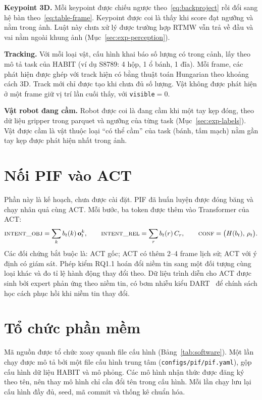 \textbf{Keypoint 3D.} Mỗi keypoint được chiếu ngược theo~\eqref{eq:backproject} rồi đổi sang hệ bàn theo~\eqref{eq:table-frame}. Keypoint được coi là thấy khi score đạt ngưỡng và nằm trong ảnh. Luật này chưa xử lý được trường hợp RTMW vẫn trả về đầu và vai nằm ngoài khung ảnh (Mục~\ref{sec:exp-perception}).

\textbf{Tracking.} Với mỗi loại vật, cấu hình khai báo số lượng có trong cảnh, lấy theo mô tả task của HABIT (ví dụ S8789: 4 hộp, 1 ổ bánh, 1 đĩa). Mỗi frame, các phát hiện được ghép với track hiện có bằng thuật toán Hungarian theo khoảng cách 3D. Track mới chỉ được tạo khi chưa đủ số lượng. Vật không được phát hiện ở một frame giữ vị trí lần cuối thấy, với \texttt{visible}$=0$.

\textbf{Vật robot đang cầm.} Robot được coi là đang cầm khi một tay kẹp đóng, theo dữ liệu gripper trong parquet và ngưỡng của từng task (Mục~\ref{sec:exp-labels}). Vật được cầm là vật thuộc loại ``có thể cầm'' của task (bánh, tấm mạch) nằm gần tay kẹp được phát hiện nhất trong ảnh.

\section{Nối PIF vào ACT}
\label{sec:method-act}

Phần này là kế hoạch, chưa được cài đặt. PIF đã huấn luyện được đóng băng và chạy nhân quả cùng ACT. Mỗi bước, ba token được thêm vào Transformer của ACT:
\begin{equation}
  \textsc{intent\_obj}=\sum_k b_t(k)\,\mathbf{o}^k_t,\qquad
  \textsc{intent\_rel}=\sum_r b_t(r)\,C_r,\qquad
  \textsc{conf}=\big(H(b_t),\,\rho_t\big).
  \label{eq:act-tokens}
\end{equation}
Các đối chứng bắt buộc là: ACT gốc; ACT có thêm 2--4 frame lịch sử; ACT với ý định có giám sát. Phép kiểm RQ1.1 hoán đổi niềm tin sang một đối tượng cùng loại khác và đo tỉ lệ hành động thay đổi theo. Dữ liệu trình diễn cho ACT được sinh bởi expert phản ứng theo niềm tin, có bơm nhiễu kiểu DART~\cite{laskey2017dart} để chính sách học cách phục hồi khi niềm tin thay đổi.

\section{Tổ chức phần mềm}
\label{sec:method-software}

Mã nguồn được tổ chức xoay quanh file cấu hình (Bảng~\ref{tab:software}). Một lần chạy được mô tả bởi một file cấu hình trung tâm (\texttt{configs/pif/pif.yaml}), gộp cấu hình dữ liệu HABIT và mô phỏng. Các mô hình nhận thức được đăng ký theo tên, nên thay mô hình chỉ cần đổi tên trong cấu hình. Mỗi lần chạy lưu lại cấu hình đầy đủ, seed, mã commit và thống kê chuẩn hóa.

